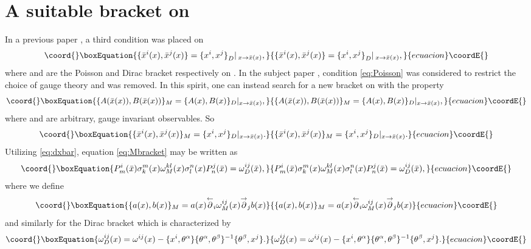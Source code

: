 \documentclass[a4paper,12pt]{article}
\theoremstyle{definition}
\theoremstyle{remark}
\numberwithin{equation}{section}
\providecommand{\al}{\alpha}
\providecommand{\be}{\beta}
\providecommand{\om}{\omega}
\providecommand{\si}{\sigma}
\providecommand{\ra}{\rightarrow}
\providecommand{\M}{\mathcal{M}}
\providecommand{\bx}{\bar{x}}
\providecommand{\pl}{\overset{\leftarrow}{\partial}}
\providecommand{\pr}{\overset{\rightarrow}{\partial}}
\begin{document}
\section{A suitable bracket on \myHighlight{$\M$}\coordHE{}}\label{sec:Mybracket}

In a previous paper \cite{Lyakhovich:2001cm}, a third condition was
placed on \myHighlight{$\bx^i(x)$}\coordHE{}
\begin{equation}\coord{}\boxEquation{\label{eq:Poisson}
{\{\bx^i(x), \bx^j(x)\}}={\{x^i,x^j\}}_D|_{\:x \ra \bx(x)},
}{{\{\bx^i(x), \bx^j(x)\}}={\{x^i,x^j\}}_D|_{\:x \ra \bx(x)},
}{ecuacion}\coordE{}\end{equation}
where \myHighlight{$\{,\}$}\coordHE{} and \coordHE{} are the Poisson and Dirac bracket
respectively on \myHighlight{$\M$}\coordHE{}. In the subject paper \cite{Batalin:2001hs},
condition \eqref{eq:Poisson} was considered to restrict the choice
of gauge theory and was removed. In this spirit, one can instead
search for a new bracket \coordHE{} on \myHighlight{$\M$}\coordHE{} with the property
\begin{equation}\coord{}\boxEquation{\label{eq:mybracket}
\{A(\bx(x)),B(\bx(x))\}_M=\{A(x),B(x)\}_D|_{x \ra \bx(x)},
}{\{A(\bx(x)),B(\bx(x))\}_M=\{A(x),B(x)\}_D|_{x \ra \bx(x)},
}{ecuacion}\coordE{}\end{equation}
where \myHighlight{$A(\bx(x))$}\coordHE{} and \myHighlight{$B(\bx(x))$}\coordHE{} are arbitrary, gauge invariant
observables. So
\begin{equation}\coord{}\boxEquation{ \label{eq:Mbracket}
\{\bx^i(x),\bx^j(x)\}_M=\{x^i,x^j\}_D|_{x \ra \bx(x)}.
}{ \{\bx^i(x),\bx^j(x)\}_M=\{x^i,x^j\}_D|_{x \ra \bx(x)}.
}{ecuacion}\coordE{}\end{equation}
Utilizing \eqref{eq:dxbar}, equation \eqref{eq:Mbracket} may be
written as
\begin{equation}\coord{}\boxEquation{
P^i_m(\bx)\si^m_k(x)\om^{kl}_M(x)\si_l^n(x)P_n^j(\bx)=\om^{ij}_D(\bx),
}{
P^i_m(\bx)\si^m_k(x)\om^{kl}_M(x)\si_l^n(x)P_n^j(\bx)=\om^{ij}_D(\bx),
}{ecuacion}\coordE{}\end{equation}
where we define
\begin{equation}\coord{}\boxEquation{
\{a(x),b(x)\}_M=a(x)\pl_i\om^{ij}_M(x)\pr_j b(x)
}{
\{a(x),b(x)\}_M=a(x)\pl_i\om^{ij}_M(x)\pr_j b(x)
}{ecuacion}\coordE{}\end{equation}
and similarly for the Dirac bracket which is characterized by
\begin{equation}\coord{}\boxEquation{
\om_D^{ij}(x)=\om^{ij}(x) - \{x^i,\theta^\al\}
\{\theta^\al,\theta^\be\}^{-1} \{\theta^\be ,x^j\}.
}{
\om_D^{ij}(x)=\om^{ij}(x) - \{x^i,\theta^\al\}
\{\theta^\al,\theta^\be\}^{-1} \{\theta^\be ,x^j\}.
}{ecuacion}\coordE{}\end{equation}
\end{document}

